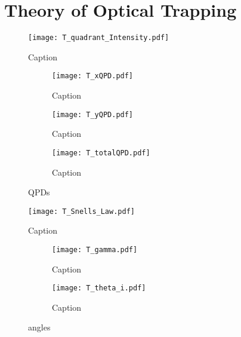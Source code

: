 \chapter[Theory]{Theory of Optical Trapping}\label{ch:theory}

\lipsum[1-5]

\begin{figure}[htp]
  \centering
  \texttt{[image: T\_quadrant\_Intensity.pdf]}
  \caption{Caption}
  \label{fig:T_quadrant_Intensity}
\end{figure}

\lipsum[1-5]
\begin{figure}
  \centering
  \begin{subfigure}[b]{0.3\textwidth}
    \centering
    \texttt{[image: T\_xQPD.pdf]}
    \caption{Caption}
    \label{fig:T_xQPD}
  \end{subfigure}
  \hfill
  \begin{subfigure}[b]{0.3\textwidth}
    \centering
    \texttt{[image: T\_yQPD.pdf]}
    \caption{Caption}
    \label{fig:T_yQPD}
  \end{subfigure}
  \hfill
  \begin{subfigure}[b]{0.3\textwidth}
    \centering
    \texttt{[image: T\_totalQPD.pdf]}
    \caption{Caption}
    \label{fig:T_totalQPD}
  \end{subfigure}
  \caption{QPDs}
  \label{fig:QPDs}
\end{figure}

\lipsum[1-5]

\begin{figure}[htp]
  \centering
  \texttt{[image: T\_Snells\_Law.pdf]}
  \caption{Caption}
  \label{fig:T_snell}
\end{figure}

\lipsum[1-5]

\begin{figure}
  \centering
  \begin{subfigure}[b]{0.45\textwidth}
    \centering
    \texttt{[image: T\_gamma.pdf]}
    \caption{Caption}
    \label{fig:T_gamma}
  \end{subfigure}
  \hfill
  \begin{subfigure}[b]{0.45\textwidth}
    \centering
    \texttt{[image: T\_theta\_i.pdf]}
    \caption{Caption}
    \label{fig:T_theta_i}
  \end{subfigure}
  \caption{angles}
  \label{fig:T_gamma_theta}
\end{figure}

